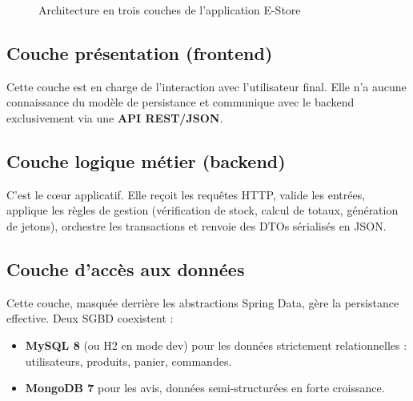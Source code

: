 \documentclass[11pt,a4paper,oneside]{report}
\begin{document}
\begin{figure}[htbp]
\centering
{}
\caption{Architecture en trois couches de l'application E-Store}
\label{fig:archi-3layers}
\end{figure}

\subsection{Couche présentation (frontend)}
Cette couche est en charge de l'interaction avec l'utilisateur final. Elle
n'a aucune connaissance du modèle de persistance et communique avec le
backend exclusivement via une \textbf{API REST/JSON}.

\subsection{Couche logique métier (backend)}
C'est le c\oe ur applicatif. Elle reçoit les requêtes HTTP, valide les
entrées, applique les règles de gestion (vérification de stock,
calcul de totaux, génération de jetons), orchestre les transactions et
renvoie des DTOs sérialisés en JSON.

\subsection{Couche d'accès aux données}
Cette couche, masquée derrière les abstractions Spring Data, gère la
persistance effective. Deux SGBD coexistent :
\begin{itemize}
  \item \textbf{MySQL 8} (ou H2 en mode dev) pour les données strictement
    relationnelles : utilisateurs, produits, panier, commandes.
  \item \textbf{MongoDB 7} pour les avis, données semi-structurées en
    forte croissance.
\end{itemize}
\end{document}
